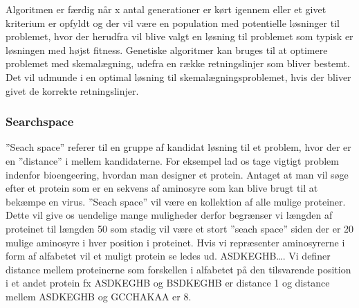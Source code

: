 Algoritmen er færdig når x antal generationer er kørt igennem eller et givet kriterium er opfyldt og der vil være en population med potentielle løsninger til problemet, hvor der herudfra vil blive valgt en løsning til problemet som typisk er løsningen med højst fitness. Genetiske algoritmer kan bruges til at optimere problemet med skemalægning, udefra en række retningslinjer som bliver bestemt. Det vil udmunde i en optimal løsning til skemalægningsproblemet, hvis der bliver givet de korrekte retningslinjer.

\subsubsection{Searchspace}

”Seach space” referer til en gruppe af kandidat løsning til et problem, hvor der er en ”distance” i mellem kandidaterne. For eksempel lad os tage vigtigt problem indenfor bioengeering, hvordan man designer et protein. Antaget at man vil søge efter et protein som er en sekvens af aminosyre som kan blive brugt til at bekæmpe en virus. ”Seach space” vil være en kollektion af alle mulige proteiner. Dette vil give os uendelige mange muligheder derfor begrænser vi længden af proteinet til længden 50 som stadig vil være et stort ”seach space” siden der er 20 mulige aminosyre i hver position i proteinet. Hvis vi repræsenter aminosyrerne i form af alfabetet vil et muligt protein se ledes ud. 
ASDKEGHB…. Vi definer distance mellem proteinerne som forskellen i alfabetet på den tilsvarende position i et andet protein fx ASDKEGHB og BSDKEGHB er distance 1 og distance mellem ASDKEGHB og GCCHAKAA er 8.
